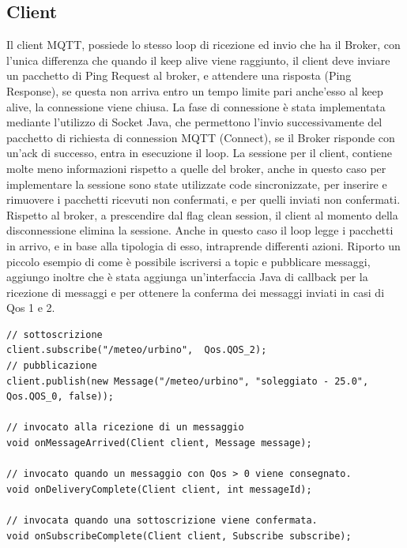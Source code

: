 \documentclass{article}
\begin{document}
\subsection{Client}
Il client MQTT, possiede lo stesso loop di ricezione ed invio che ha il Broker, con l'unica differenza che quando il keep alive viene raggiunto, il client deve inviare un pacchetto di Ping Request al broker, e attendere una risposta (Ping Response), se questa non arriva entro un tempo limite pari anche'esso al keep alive, la connessione viene chiusa. La fase di connessione è stata implementata mediante l'utilizzo di Socket Java, che permettono l'invio successivamente del pacchetto di richiesta di connession MQTT (Connect), se il Broker risponde con un'ack di successo, entra in esecuzione il loop. La sessione per il client, contiene molte meno informazioni rispetto a quelle del broker, anche in questo caso per implementare la sessione sono state utilizzate code sincronizzate, per inserire e rimuovere i pacchetti ricevuti non confermati, e per quelli inviati non confermati. Rispetto al broker, a prescendire dal flag clean session, il client al momento della disconnessione elimina la sessione. Anche in questo caso il loop legge i pacchetti in arrivo, e in base alla tipologia di esso, intraprende differenti azioni. Riporto un piccolo esempio di come è possibile iscriversi a topic e pubblicare messaggi, aggiungo inoltre che è stata aggiunga un'interfaccia Java di callback per la ricezione di messaggi e per ottenere la conferma dei messaggi inviati in casi di Qos 1 e 2.
\begin{lstlisting}[style=JavaStyle]
// sottoscrizione
client.subscribe("/meteo/urbino",  Qos.QOS_2);
// pubblicazione
client.publish(new Message("/meteo/urbino", "soleggiato - 25.0", Qos.QOS_0, false));

// invocato alla ricezione di un messaggio
void onMessageArrived(Client client, Message message);

// invocato quando un messaggio con Qos > 0 viene consegnato.
void onDeliveryComplete(Client client, int messageId);

// invocata quando una sottoscrizione viene confermata.
void onSubscribeComplete(Client client, Subscribe subscribe);

\end{lstlisting}
\end{document}
